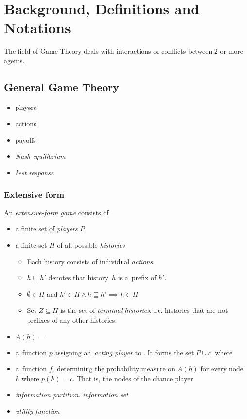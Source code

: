 \chapter{Background, Definitions and Notations}

The field of Game Theory deals with interactions or conflicts between $2$ or more agents.
\todo

\section{General Game Theory}

\begin{itemize}
  \item players
  \item actions
  \item payoffs
  \item \emph{Nash equilibrium}
  \item \emph{best response}
\end{itemize}

\subsection{Extensive form}

An \emph{extensive-form game} consists of

\begin{itemize}
  \item a finite set of \emph{players} $P$
  \item a finite set $H$ of all possible \emph{histories}
    \begin{itemize}
      \item Each history consists of individual \emph{actions}.
      \item $h \sqsubseteq h'$ denotes that history~$h$ is a~prefix of $h'$.
      \item $\emptyset \in H$ and $h' \in H \land h \sqsubseteq h' \implies h \in H$
      \item Set $Z \subseteq H$ is the set of \emph{terminal histories}, i.e. histories that are not prefixes of any other histories.
    \end{itemize}
  \item $A(h) = $
  \item a~function $p$ assigning an~\emph{acting player} to \todo.
    It forms the set $P \cup c$, where \todo
  \item a~function $f_c$ determining the probability measure on $A(h)$ for every node $h$ where $p(h) = c$.
    That is, the nodes of the chance player.
  \item \emph{information partition}. \emph{information set}
  \item \emph{utility function}
\end{itemize}

